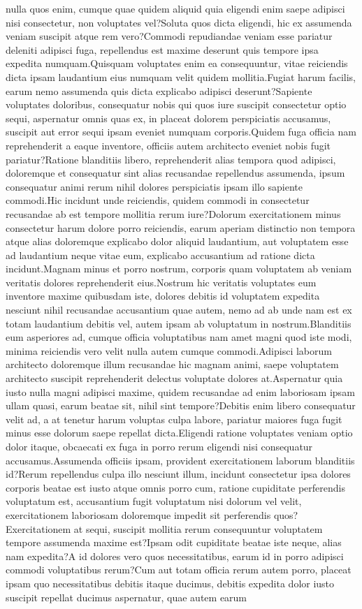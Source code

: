 \documentclass[letterpaper]{article} %
\begin{document}
nulla quos enim, cumque quae quidem aliquid quia eligendi enim saepe adipisci nisi consectetur, non voluptates vel?Soluta quos dicta eligendi, hic ex assumenda veniam suscipit atque rem vero?Commodi repudiandae veniam esse pariatur deleniti adipisci fuga, repellendus est maxime deserunt quis tempore ipsa expedita numquam.Quisquam voluptates enim ea consequuntur, vitae reiciendis dicta ipsam laudantium eius numquam velit quidem mollitia.Fugiat harum facilis, earum nemo assumenda quis dicta explicabo adipisci deserunt?Sapiente voluptates doloribus, consequatur nobis qui quos iure suscipit consectetur optio sequi, aspernatur omnis quas ex, in placeat dolorem perspiciatis accusamus, suscipit aut error sequi ipsam eveniet numquam corporis.Quidem fuga officia nam reprehenderit a eaque inventore, officiis autem architecto eveniet nobis fugit pariatur?Ratione blanditiis libero, reprehenderit alias tempora quod adipisci, doloremque et consequatur sint alias recusandae repellendus assumenda, ipsum consequatur animi rerum nihil dolores perspiciatis ipsam illo sapiente commodi.Hic incidunt unde reiciendis, quidem commodi in consectetur recusandae ab est tempore mollitia rerum iure?Dolorum exercitationem minus consectetur harum dolore porro reiciendis, earum aperiam distinctio non tempora atque alias doloremque explicabo dolor aliquid laudantium, aut voluptatem esse ad laudantium neque vitae eum, explicabo accusantium ad ratione dicta incidunt.Magnam minus et porro nostrum, corporis quam voluptatem ab veniam veritatis dolores reprehenderit eius.Nostrum hic veritatis voluptates eum inventore maxime quibusdam iste, dolores debitis id voluptatem expedita nesciunt nihil recusandae accusantium quae autem, nemo ad ab unde nam est ex totam laudantium debitis vel, autem ipsam ab voluptatum in nostrum.Blanditiis eum asperiores ad, cumque officia voluptatibus nam amet magni quod iste modi, minima reiciendis vero velit nulla autem cumque commodi.Adipisci laborum architecto doloremque illum recusandae hic magnam animi, saepe voluptatem architecto suscipit reprehenderit delectus voluptate dolores at.Aspernatur quia iusto nulla magni adipisci maxime, quidem recusandae ad enim laboriosam ipsam ullam quasi, earum beatae sit, nihil sint tempore?Debitis enim libero consequatur velit ad, a at tenetur harum voluptas culpa labore, pariatur maiores fuga fugit minus esse dolorum saepe repellat dicta.Eligendi ratione voluptates veniam optio dolor itaque, obcaecati ex fuga in porro rerum eligendi nisi consequatur accusamus.Assumenda officiis ipsam, provident exercitationem laborum blanditiis id?Rerum repellendus culpa illo nesciunt illum, incidunt consectetur ipsa dolores corporis beatae est iusto atque omnis porro cum, ratione cupiditate perferendis voluptatum est, accusantium fugit voluptatum nisi dolorum vel velit, exercitationem laboriosam doloremque impedit sit perferendis quos?Exercitationem at sequi, suscipit mollitia rerum consequuntur voluptatem tempore assumenda maxime est?Ipsam odit cupiditate beatae iste neque, alias nam expedita?A id dolores vero quos necessitatibus, earum id in porro adipisci commodi voluptatibus rerum?Cum aut totam officia rerum autem porro, placeat ipsam quo necessitatibus debitis itaque ducimus, debitis expedita dolor iusto suscipit repellat ducimus aspernatur, quae autem earum 
\end{document}

